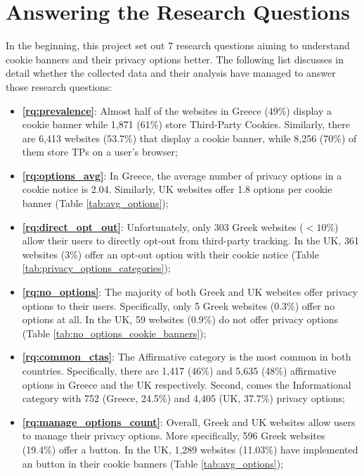 \documentclass[../main.tex]{subfiles}
\begin{document}
\section{Answering the Research Questions}
In the beginning, this project set out 7 research questions aiming to understand cookie banners and their privacy options better. The following list discusses in detail whether the collected data and their analysis have managed to answer those research questions: 

\begin{itemize}
    \item \textbf{\ref{rq:prevalence}}: Almost half of the websites in Greece (49\%) display a cookie banner while 1,871 (61\%) store Third-Party Cookies. Similarly, there are 6,413 websites (53.7\%) that display a cookie banner, while 8,256 (70\%) of them store TPs on a user’s browser;

    \item \textbf{\ref{rq:options_avg}}: In Greece, the average number of privacy options in a cookie notice is 2.04. Similarly, UK websites offer 1.8 options per cookie banner (Table \ref{tab:avg_options});

    \item \textbf{\ref{rq:direct_opt_out}}: Unfortunately, only 303 Greek websites ($<10\%$) allow their users to directly opt-out from third-party tracking. In the UK, 361 websites (3\%) offer an opt-out option with their cookie notice (Table \ref{tab:privacy_options_categories});

    \item \textbf{\ref{rq:no_options}}: The majority of both Greek and UK websites offer privacy options to their users. Specifically, only 5 Greek websites (0.3\%) offer no options at all. In the UK, 59 websites (0.9\%) do not offer privacy options (Table \ref{tab:no_options_cookie_banners});

    \item \textbf{\ref{rq:common_ctas}}: The Affirmative category is the most common in both countries. Specifically, there are 1,417 (46\%) and 5,635 (48\%) affirmative options in Greece and the UK respectively. Second, comes the Informational category with 752 (Greece, 24.5\%) and 4,405 (UK, 37.7\%) privacy options;

    \item \textbf{\ref{rq:manage_options_count}}: Overall, Greek and UK websites allow users to manage their privacy options. More specifically, 596 Greek websites (19.4\%) offer a  button. In the UK, 1,289 websites (11.03\%) have implemented an  button in their cookie banners (Table \ref{tab:avg_options});


\end{itemize}
\end{document}
